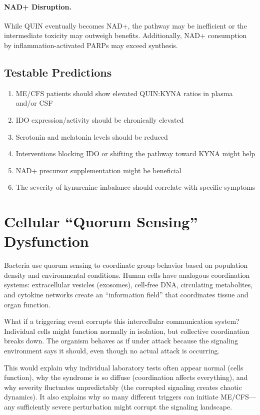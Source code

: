 \paragraph{NAD+ Disruption.} While QUIN eventually becomes NAD+, the pathway may be inefficient or the intermediate toxicity may outweigh benefits. Additionally, NAD+ consumption by inflammation-activated PARPs may exceed synthesis.

\subsection{Testable Predictions}

\begin{enumerate}
    \item ME/CFS patients should show elevated QUIN:KYNA ratios in plasma and/or CSF
    \item IDO expression/activity should be chronically elevated
    \item Serotonin and melatonin levels should be reduced
    \item Interventions blocking IDO or shifting the pathway toward KYNA might help
    \item NAD+ precursor supplementation might be beneficial
    \item The severity of kynurenine imbalance should correlate with specific symptoms
\end{enumerate}


\section{Cellular ``Quorum Sensing'' Dysfunction}
\label{sec:quorum-sensing}

\begin{open_question}
Bacteria use quorum sensing to coordinate group behavior based on population density and environmental conditions. Human cells have analogous coordination systems: extracellular vesicles (exosomes), cell-free DNA, circulating metabolites, and cytokine networks create an ``information field'' that coordinates tissue and organ function.

What if a triggering event corrupts this intercellular communication system? Individual cells might function normally in isolation, but collective coordination breaks down. The organism behaves as if under attack because the signaling environment says it should, even though no actual attack is occurring.

This would explain why individual laboratory tests often appear normal (cells function), why the syndrome is so diffuse (coordination affects everything), and why severity fluctuates unpredictably (the corrupted signaling creates chaotic dynamics). It also explains why so many different triggers can initiate ME/CFS---any sufficiently severe perturbation might corrupt the signaling landscape.
\end{open_question}


